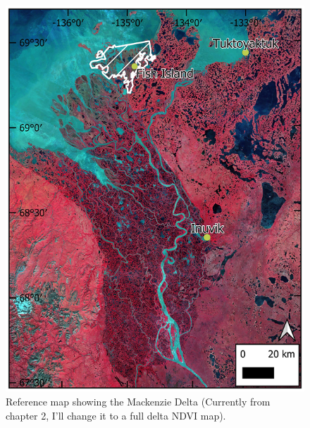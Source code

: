 \documentclass[
]{book}
\begin{document}
\begin{figure}
\includegraphics[width=1\linewidth]{images/16-fig1} \caption{Reference map showing the Mackenzie Delta (Currently from chapter 2, I'll change it to a full delta NDVI map).}\label{fig:16-fig1-2}
\end{figure}
\end{document}
